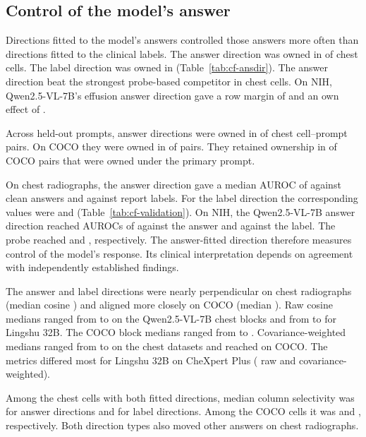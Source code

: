 \subsection{Control of the model's answer}
\label{sec:ansdir}
\label{app:cf-ansdir}

Directions fitted to the model's answers controlled those answers more often than directions fitted to the clinical labels. The answer direction was owned in \cfAnsChestOwnedA{} of \cfAnsChestN{} chest cells. The label direction was owned in \cfAnsChestOwnedLabel{} (Table~\ref{tab:cf-ansdir}). The answer direction beat the strongest probe-based competitor in \cfAnsChestBeats{} chest cells. On NIH, Qwen2.5-VL-7B's effusion answer direction gave a row margin of \cfAnsQwenEffO{} and an own effect of \cfAnsQwenEffW{}.

Across held-out prompts, answer directions were owned in \cfAnsdirtChestOwnedPairs{} of \cfAnsdirtChestPairsAll{} chest cell--prompt pairs. On COCO they were owned in \cfAnsdirtCocoOwnedPairs{} of \cfAnsdirtCocoPairsAll{} pairs. They retained ownership in \cfAnsdirtCocoKept{} of \cfAnsdirtCocoKeptN{} COCO pairs that were owned under the primary prompt.



On chest radiographs, the answer direction gave a median AUROC of \cfValAurocAnsCleanChest{} against clean answers and \cfValAurocAnsChest{} against report labels. For the label direction the corresponding values were \cfValAurocProbeCleanChest{} and \cfValAurocProbeChest{} (Table~\ref{tab:cf-validation}). On NIH, the Qwen2.5-VL-7B answer direction reached AUROCs of \cfValAurocAnsCleanQwenNih{} against the answer and \cfValAurocAnsQwenNih{} against the label. The probe reached \cfValAurocProbeCleanQwenNih{} and \cfValAurocProbeQwenNih{}, respectively. The answer-fitted direction therefore measures control of the model's response. Its clinical interpretation depends on agreement with independently established findings.

The answer and label directions were nearly perpendicular on chest radiographs (median cosine \cfAnsCosChestMed{}) and aligned more closely on COCO (median \cfAnsCosCocoMed{}). Raw cosine medians ranged from \cfAnsCosQwenMin{} to \cfAnsCosQwenMax{} on the Qwen2.5-VL-7B chest blocks and from \cfAnsCosLingMin{} to \cfAnsCosLingMax{} for Lingshu 32B. The COCO block medians ranged from \cfAnsCosCocoMin{} to \cfAnsCosCocoMax{}. Covariance-weighted medians ranged from \cfValCosSigmaChestMin{} to \cfValCosSigmaChestMax{} on the chest datasets and reached \cfValCosSigmaCoco{} on COCO. The metrics differed most for Lingshu 32B on CheXpert Plus (\cfValCosRawLingChex{} raw and \cfValCosSigmaLingChex{} covariance-weighted).



Among the \cfAnsColSelChestN{} chest cells with both fitted directions, median column selectivity was \cfAnsColSelChest{} for answer directions and \cfAnsColSelLabelChest{} for label directions. Among the \cfAnsColSelCocoN{} COCO cells it was \cfAnsColSelCoco{} and \cfAnsColSelLabelCoco{}, respectively. Both direction types also moved other answers on chest radiographs.



